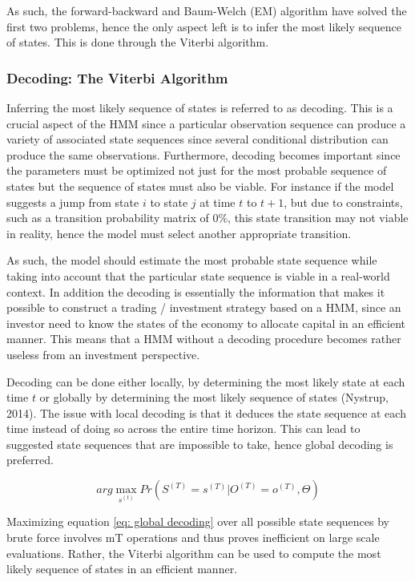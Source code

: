 As such, the forward-backward and Baum-Welch (EM) algorithm have solved the first two problems, hence the only aspect left is to infer the most likely sequence of states. This is done through the Viterbi algorithm. 
 
\subsubsection{Decoding: The Viterbi Algorithm}
\label{subsection: Decoding}
Inferring the most likely sequence of states is referred to as decoding. This is a crucial aspect of the HMM since a particular observation sequence can produce a variety of associated state sequences since several conditional distribution can produce the same observations. Furthermore, decoding becomes important since the parameters must be optimized not just for the most probable sequence of states but the sequence of states must also be viable. For instance if the model suggests a jump from state $i$ to state $j$ at time $t$ to $t+1$, but due to constraints, such as a transition probability matrix of 0\%, this state transition may not viable in reality, hence the model must select another appropriate transition. 

As such, the model should estimate the most probable state sequence while taking into account that the particular state sequence is viable in a real-world context. In addition the decoding is essentially the information that makes it possible to construct a trading / investment strategy based on a HMM, since an investor need to know the states of the economy to allocate capital in an efficient manner. This means that a HMM without a decoding procedure becomes rather useless from an investment perspective. 

Decoding can be done either locally, by determining the most likely state at each time $t$ or globally by determining the most likely sequence of states (Nystrup, 2014). The issue with local decoding is that it deduces the state sequence at each time instead of doing so across the entire time horizon. This can lead to suggested state sequences that are impossible to take, hence global decoding is preferred. 

\begin{equation}
    arg\max_{s^{(t)}}Pr(S^{(T)} = s^{(T)}|O^{(T)} = o^{(T)}, \Theta)
    \label{eq: global decoding}
\end{equation}

Maximizing equation \ref{eq: global decoding} over all possible state sequences by brute force involves mT operations and thus proves inefficient on large scale evaluations. Rather, the Viterbi algorithm can be used to compute
the most likely sequence of states in an efficient manner. 

